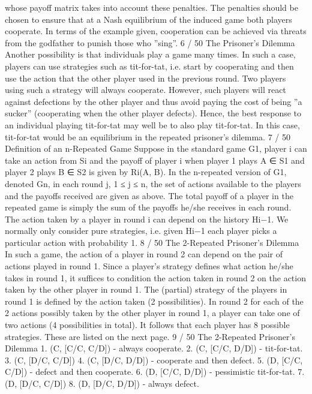 \documentclass[]{report}
\begin{document}
whose payoff matrix takes into account these penalties.
The penalties should be chosen to ensure that at a Nash
equilibrium of the induced game both players cooperate.
In terms of the example given, cooperation can be achieved via
threats from the godfather to punish those who ”sing”.
6 / 50
The Prisoner’s Dilemma
Another possibility is that individuals play a game many times.
In such a case, players can use strategies such as tit-for-tat, i.e.
start by cooperating and then use the action that the other player
used in the previous round.
Two players using such a strategy will always cooperate. However,
such players will react against defections by the other player and
thus avoid paying the cost of being ”a sucker” (cooperating when
the other player defects).
Hence, the best response to an individual playing tit-for-tat may
well be to also play tit-for-tat. In this case, tit-for-tat would be an
equilibrium in the repeated prisoner’s dilemma.
7 / 50
Definition of an n-Repeated Game
Suppose in the standard game G1, player i can take an action from
Si and the payoff of player i when player 1 plays A ∈ S1 and player
2 plays B ∈ S2 is given by Ri(A, B).
In the n-repeated version of G1, denoted Gn, in each round j,
1 ≤ j ≤ n, the set of actions available to the players and the
payoffs received are given as above.
The total payoff of a player in the repeated game is simply the sum
of the payoffs he/she receives in each round.
The action taken by a player in round i can depend on the history
Hi−1. We normally only consider pure strategies, i.e. given Hi−1
each player picks a particular action with probability 1.
8 / 50
The 2-Repeated Prisoner’s Dilemma
In such a game, the action of a player in round 2 can depend on
the pair of actions played in round 1.
Since a player’s strategy defines what action he/she takes in round
1, it suffices to condition the action taken in round 2 on the action
taken by the other player in round 1.
The (partial) strategy of the players in round 1 is defined by the
action taken (2 possibilities). In round 2 for each of the 2 actions
possibly taken by the other player in round 1, a player can take one
of two actions (4 possibilities in total).
It follows that each player has 8 possible strategies. These are
listed on the next page.
9 / 50
The 2-Repeated Prisoner’s Dilemma
1. (C, [C/C, C/D]) - always cooperate.
2. (C, [C/C, D/D]) - tit-for-tat.
3. (C, [D/C, C/D])
4. (C, [D/C, D/D]) - cooperate and then defect.
5. (D, [C/C, C/D]) - defect and then cooperate.
6. (D, [C/C, D/D]) - pessimistic tit-for-tat.
7. (D, [D/C, C/D])
8. (D, [D/C, D/D]) - always defect.
\end{document}
